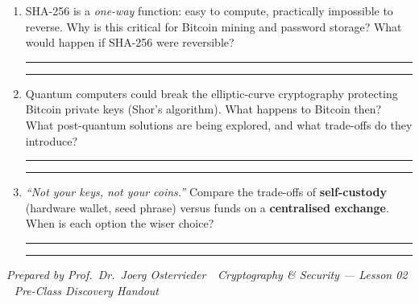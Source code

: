 \documentclass[11pt,a4paper]{article}
\begin{document}
\begin{enumerate}[leftmargin=1.8em, label=\textbf{\color{mlpurple}\arabic*.}]
  \item SHA-256 is a \emph{one-way} function: easy to compute, practically impossible to reverse.
        Why is this critical for Bitcoin mining and password storage?
        What would happen if SHA-256 were reversible?

  \vspace{7pt}\noindent\rule{\linewidth}{0.3pt}\vspace{2pt}\noindent\rule{\linewidth}{0.3pt}
  \vspace{3pt}

  \item Quantum computers could break the elliptic-curve cryptography protecting Bitcoin private
        keys (Shor's algorithm). What happens to Bitcoin then?
        What post-quantum solutions are being explored, and what trade-offs do they introduce?

  \vspace{7pt}\noindent\rule{\linewidth}{0.3pt}\vspace{2pt}\noindent\rule{\linewidth}{0.3pt}
  \vspace{3pt}

  \item \textit{``Not your keys, not your coins.''} Compare the trade-offs of
        \textbf{self-custody} (hardware wallet, seed phrase) versus funds on a
        \textbf{centralised exchange}. When is each option the wiser choice?

  \vspace{7pt}\noindent\rule{\linewidth}{0.3pt}\vspace{2pt}\noindent\rule{\linewidth}{0.3pt}
\end{enumerate}

\vspace{4pt}
\noindent\textcolor{mlgray}{\small\textit{Prepared by Prof.\ Dr.\ Joerg Osterrieder \,\textbullet\, Cryptography \& Security --- Lesson 02 \,\textbullet\, Pre-Class Discovery Handout}}
\end{document}
